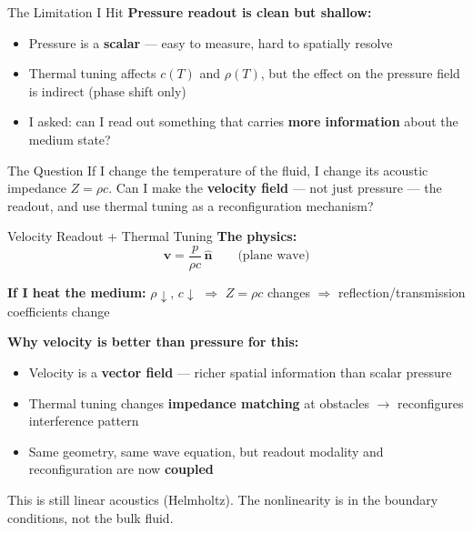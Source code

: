 \documentclass[aspectratio=169,11pt]{beamer}
\begin{document}
\begin{frame}{The Limitation I Hit}
  \textbf{Pressure readout is clean but shallow:}

  \vspace{0.2cm}
  \begin{itemize}
    \item Pressure is a \textbf{scalar} --- easy to measure, hard to spatially resolve
    \item Thermal tuning affects $c(T)$ and $\rho(T)$, but the effect on the pressure field is indirect (phase shift only)
    \item I asked: can I read out something that carries \textbf{more information} about the medium state?
  \end{itemize}

  \vspace{0.3cm}
  \begin{block}{\footnotesize The Question}
    \footnotesize
    If I change the temperature of the fluid, I change its acoustic impedance $Z = \rho c$. Can I make the \textbf{velocity field} --- not just pressure --- the readout, and use thermal tuning as a reconfiguration mechanism?
  \end{block}
\end{frame}

\begin{frame}{Velocity Readout + Thermal Tuning}
  \textbf{The physics:}
  \[
    \mathbf{v} = \frac{p}{\rho c}\,\hat{\mathbf{n}} \qquad \text{(plane wave)}
  \]

  \vspace{0.1cm}
  \textbf{If I heat the medium:} $\rho \downarrow$, $c \downarrow$ $\Rightarrow$ $Z = \rho c$ changes $\Rightarrow$ reflection/transmission coefficients change

  \vspace{0.2cm}
  \textbf{Why velocity is better than pressure for this:}
  \begin{itemize}
    \item Velocity is a \textbf{vector field} --- richer spatial information than scalar pressure
    \item Thermal tuning changes \textbf{impedance matching} at obstacles $\rightarrow$ reconfigures interference pattern
    \item Same geometry, same wave equation, but readout modality and reconfiguration are now \textbf{coupled}
  \end{itemize}

  \vspace{0.2cm}
  \textcolor{gdpBurgundy}{\small This is still linear acoustics (Helmholtz). The nonlinearity is in the boundary conditions, not the bulk fluid.}
\end{frame}
\end{document}
